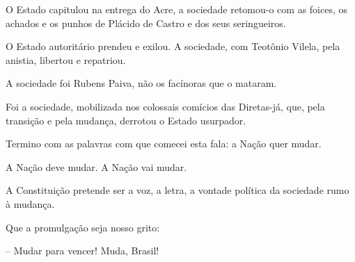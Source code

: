 O Estado capitulou na entrega do Acre, a sociedade retomou-o com as
foices, os achados e os punhos de Plácido de Castro e dos seus
seringueiros.

O Estado autoritário prendeu e exilou. A sociedade, com Teotônio Vilela,
pela anistia, libertou e repatriou.

A sociedade foi Rubens Paiva, não os facínoras que o mataram.

Foi a sociedade, mobilizada nos colossais comícios das Diretas-já, que,
pela transição e pela mudança, derrotou o Estado usurpador.

Termino com as palavras com que comecei esta fala: a Nação quer mudar.

A Nação deve mudar. A Nação vai mudar.

A Constituição pretende ser a voz, a letra, a vontade política da
sociedade rumo à mudança.

Que a promulgação seja nosso grito:

-- Mudar para vencer! Muda, Brasil!
